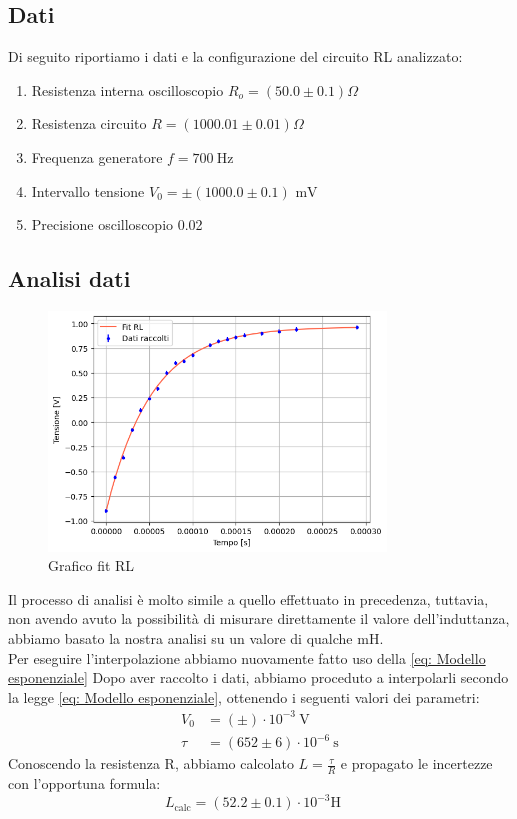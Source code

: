 \documentclass[letterpaper,12pt]{article}
\begin{document}
\subsection{Dati} %
Di seguito riportiamo i dati e la configurazione del circuito RL analizzato:
\begin{enumerate}[itemsep=1pt]
	\item Resistenza interna oscilloscopio $R_o = (50.0\pm0.1)\Omega$
	\item Resistenza circuito $R = (1000.01\pm0.01)\Omega$ %
	\item Frequenza generatore $f = \SI{700}{\hertz}$
	\item Intervallo tensione $V_0= \pm (1000.0\pm0.1)\text{ mV}$
	\item Precisione oscilloscopio 	0.02


\end{enumerate}

\subsection{Analisi dati}

\begin{figure}[h]
	\centering
	\includegraphics[width=0.8\textwidth]{RL.png} %
	\caption{Grafico fit RL}
	\label{fig:fitRL}
\end{figure}

Il processo di analisi è molto simile a quello effettuato in precedenza, tuttavia, non avendo avuto la possibilità di misurare direttamente il valore dell'induttanza, abbiamo basato la nostra analisi su un valore di qualche mH.\\

Per eseguire l'interpolazione abbiamo nuovamente fatto uso della \eqref{eq: Modello esponenziale}
Dopo aver raccolto i dati, abbiamo proceduto a interpolarli secondo la legge \eqref{eq: Modello esponenziale}, ottenendo i seguenti valori dei parametri:
\begin{align*}
	V_0  & = ( \pm )\cdot 10^{-3}\ \text{V}      \\
	\tau & = (652 \pm 6) \cdot 10^{-6}\ \text{s}
\end{align*}
Conoscendo la resistenza R, abbiamo calcolato $L= \frac{\tau}{R}$ e propagato le incertezze con l'opportuna formula:
$$ L_\text{calc}= (52.2 \pm 0.1) \cdot 10^{-3} \text{H} \quad
$$
\end{document}
